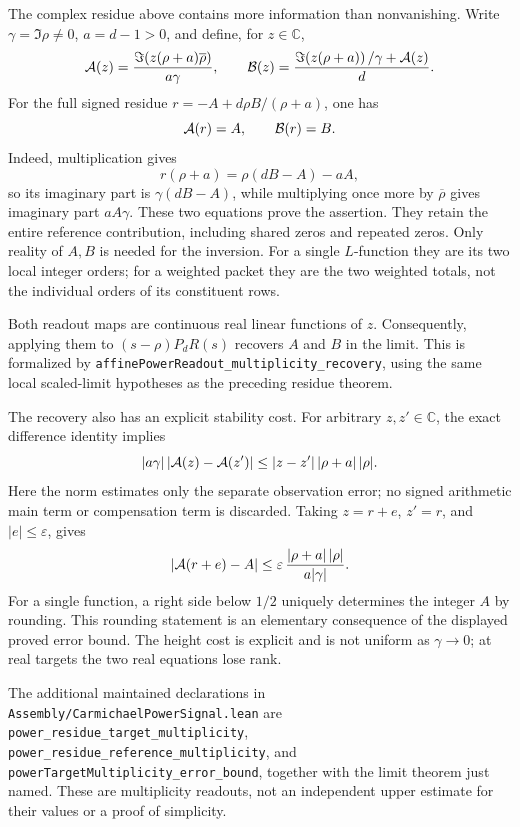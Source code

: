 The complex residue above contains more information than nonvanishing.
Write \(\gamma=\Im\rho\ne0\), \(a=d-1>0\), and define, for \(z\in\mathbb C\),
\[
 {\cal A}(z)=
 \frac{\Im\!\left(z(\rho+a)\overline\rho\right)}{a\gamma},
 \qquad
 {\cal B}(z)=
 \frac{\Im\!\left(z(\rho+a)\right)/\gamma+{\cal A}(z)}{d}.
\]
For the full signed residue \(r=-A+d\rho B/(\rho+a)\), one has
\[
 {\cal A}(r)=A,\qquad {\cal B}(r)=B.
\]
Indeed, multiplication gives
\[
 r(\rho+a)=\rho(dB-A)-aA,
\]
so its imaginary part is \(\gamma(dB-A)\), while multiplying once
more by \(\overline\rho\) gives imaginary part \(aA\gamma\).
These two equations prove the assertion. They retain the entire
reference contribution, including shared zeros and repeated zeros.
Only reality of \(A,B\) is needed for the inversion. For a single
\(L\)-function they are its two local integer orders; for a weighted
packet they are the two weighted totals, not the individual orders
of its constituent rows.

Both readout maps are continuous real linear functions of \(z\).
Consequently, applying them to
\((s-\rho)P_dR(s)\) recovers \(A\) and \(B\) in the limit.
This is formalized by
\texttt{affinePowerReadout\_multiplicity\_recovery}, using the same
local scaled-limit hypotheses as the preceding residue theorem.

The recovery also has an explicit stability cost. For arbitrary
\(z,z'\in\mathbb C\), the exact difference identity implies
\begin{equation}\label{eq:power-multiplicity-stability}
 |a\gamma|\,|{\cal A}(z)-{\cal A}(z')|
 \le |z-z'|\,|\rho+a|\,|\rho|.
\end{equation}
Here the norm estimates only the separate observation error;
no signed arithmetic main term or compensation term is discarded.
Taking \(z=r+e\), \(z'=r\), and \(|e|\le\varepsilon\), gives
\[
 |{\cal A}(r+e)-A|
 \le \varepsilon\,\frac{|\rho+a|\,|\rho|}{a|\gamma|}.
\]
For a single function, a right side below \(1/2\) uniquely
determines the integer \(A\) by rounding. This rounding statement is
an elementary consequence of the displayed proved error bound.
The height cost is explicit and is not uniform as \(\gamma\to0\);
at real targets the two real equations lose rank.

The additional maintained declarations in
\texttt{Assembly/CarmichaelPowerSignal.lean} are
\texttt{power\_residue\_target\_multiplicity},
\texttt{power\_residue\_reference\_multiplicity}, and
\texttt{powerTargetMultiplicity\_error\_bound}, together with the
limit theorem just named. These are multiplicity readouts, not an
independent upper estimate for their values or a proof of simplicity.

